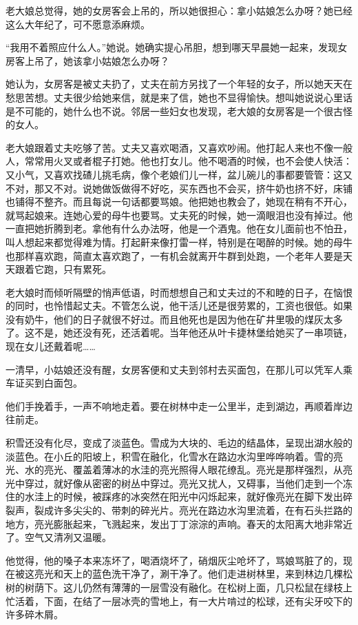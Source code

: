 老大娘总觉得，她的女房客会上吊的，所以她很担心：拿小姑娘怎么办呀？她已经这么大年纪了，可不愿意添麻烦。

“我用不着照应什么人。”她说。她确实提心吊胆，想到哪天早晨她一起来，发现女房客上吊了，她该拿小姑娘怎么办呀？

她认为，女房客是被丈夫扔了，丈夫在前方另找了一个年轻的女子，所以她天天在愁思苦想。丈夫很少给她来信，就是来了信，她也不显得愉快。想叫她说说心里话是不可能的，她什么也不说。邻居一些妇女也发现，老大娘的女房客是一个很古怪的女人。

老大娘跟着丈夫吃够了苦。丈夫又喜欢喝酒，又喜欢吵闹。他打起人来也不像一般人，常常用火叉或者棍子打她。他也打女儿。他不喝酒的时候，也不会使人快活：又小气，又喜欢找碴儿挑毛病，像个老娘们儿一样，盆儿碗儿的事都要管管：这又不对，那又不对。说她做饭做得不好吃，买东西也不会买，挤牛奶也挤不好，床铺也铺得不整齐。而且每说一句话都要骂娘。他把她也教会了，她现在稍有不开心，就骂起娘来。连她心爱的母牛也要骂。丈夫死的时候，她一滴眼泪也没有掉过。他一直把她折腾到老。拿他有什么办法呀，他是一个酒鬼。他在女儿面前也不怕丑，叫人想起来都觉得难为情。打起鼾来像打雷一样，特别是在喝醉的时候。她的母牛也那样喜欢跑，简直太喜欢跑了，一有机会就离开牛群到处跑，一个老年人要是天天跟着它跑，只有累死。

老大娘时而倾听隔壁的悄声低语，时而想想自己和丈夫过的不和睦的日子，在恼恨的同时，也怜惜起丈夫。不管怎么说，他干活儿还是很劳累的，工资也很低。如果没有奶牛，他们的日子就很不好过。而且他死也是因为他在矿井里吸的煤灰太多了。这不是，她还没有死，还活着呢。当年他还从叶卡捷林堡给她买了一串项链，现在女儿还戴着呢……

一清早，小姑娘还没有醒，女房客便和丈夫到邻村去买面包，在那儿可以凭军人乘车证买到白面包。

他们手挽着手，一声不响地走着。要在树林中走一公里半，走到湖边，再顺着岸边往前走。

积雪还没有化尽，变成了淡蓝色。雪成为大块的、毛边的结晶体，呈现出湖水般的淡蓝色。在小丘的阳坡上，积雪在融化，化雪水在路边水沟里哗哗响着。雪的亮光、水的亮光、覆盖着薄冰的水洼的亮光照得人眼花缭乱。亮光是那样强烈，从亮光中穿过，就好像从密密的树丛中穿过。亮光又扰人，又碍事，当他们走到一个冻住的水洼上的时候，被踩疼的冰突然在阳光中闪烁起来，就好像亮光在脚下发出碎裂声，裂成许多尖尖的、带刺的碎光片。亮光在路边水沟里流着，在有石头拦路的地方，亮光膨胀起来，飞溅起来，发出丁丁淙淙的声响。春天的太阳离大地非常近了。空气又清冽又温暖。

他觉得，他的嗓子本来冻坏了，喝酒烧坏了，硝烟灰尘呛坏了，骂娘骂脏了的，现在被这亮光和天上的蓝色洗干净了，涮干净了。他们走进树林里，来到林边几棵松树的树荫下。这儿仍然有薄薄的一层雪没有融化。在松树上面，几只松鼠在绿枝上忙活着，下面，在结了一层冰壳的雪地上，有一大片啃过的松球，还有尖牙咬下的许多碎木屑。

